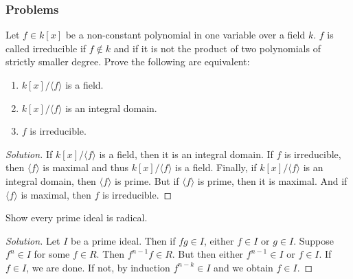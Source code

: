 \documentclass[crop=false,class=book,oneside]{standalone}
\begin{document}
            \subsubsection{Problems}
                \begin{problem}
                    Let $f\in k[x]$ be a non-constant polynomial
                    in one variable over a field $k$. $f$ is called
                    irreducible if $f\notin k$ and if it is not
                    the product of two polynomials of strictly smaller
                    degree. Prove the following are equivalent:
                    \begin{enumerate}
                        \item $k[x]/\langle f\rangle$ is a field.
                        \item $k[x]/\langle f\rangle$ is an
                              integral domain.
                        \item $f$ is irreducible.
                    \end{enumerate}
                \end{problem}
                \begin{proof}[Solution]
                    If $k[x]/\langle f\rangle$ is a field,
                    then it is an integral domain. If $f$ is
                    irreducible, then $\langle f\rangle$ is
                    maximal and thus $k[x]/\langle f\rangle$ is
                    a field. Finally, if $k[x]/\langle f\rangle$ is
                    an integral domain, then $\langle f\rangle$ is
                    prime. But if $\langle f\rangle$ is prime,
                    then it is maximal. And if $\langle f\rangle$
                    is maximal, then $f$ is irreducible. 
                \end{proof}
                \begin{problem}
                    Show every prime ideal is radical.
                \end{problem}
                \begin{proof}[Solution]
                    Let $I$ be a prime ideal. Then if $fg\in I$,
                    either $f\in I$ or $g\in I$. Suppose $f^n \in I$
                    for some $f\in R$. Then $f^{n-1}f \in R$.
                    But then either $f^{n-1} \in I$ or $f\in I$.
                    If $f\in I$, we are done. If not, by induction
                    $f^{n-k} \in I$ and we obtain $f\in I$.
                \end{proof}
\end{document}
